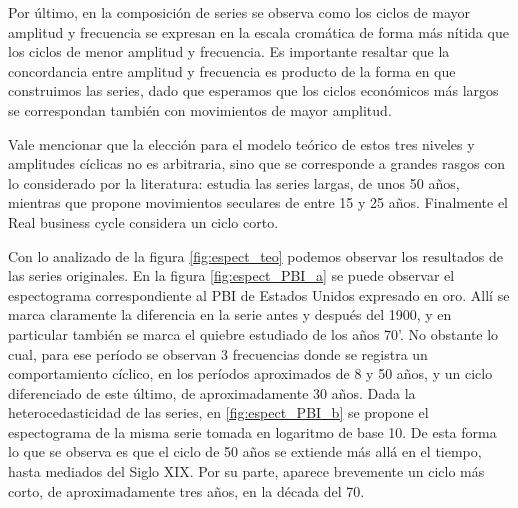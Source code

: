 \documentclass[a4paper]{article}
\begin{document}
Por último, en la composición de series se observa como los ciclos de mayor amplitud y frecuencia se expresan en la escala cromática de forma más nítida que los ciclos de menor amplitud y frecuencia. Es importante resaltar que la concordancia entre amplitud y frecuencia es producto de la forma en que construimos las series, dado que esperamos que los ciclos económicos más largos se correspondan también con movimientos de mayor amplitud.

Vale mencionar que la elección para el modelo teórico de estos tres niveles y amplitudes cíclicas no es arbitraria, sino que se corresponde a grandes rasgos con lo considerado por la literatura: \cite{kondratieff1979long} estudia las series largas, de unos 50 años, mientras que \cite{kuznets1930secular} propone movimientos seculares de entre 15 y 25 años. Finalmente el Real business cycle \citep{kydland1982time} considera un ciclo corto.



Con lo analizado de la figura \ref{fig:espect_teo} podemos observar los resultados de las series originales. En la figura \ref{fig:espect_PBI_a} se puede observar el espectograma correspondiente al PBI de Estados Unidos expresado en oro. Allí se marca claramente la diferencia en la serie antes y después del 1900, y en particular también se marca el quiebre estudiado de los años 70'. No obstante lo cual, para ese período se observan 3 frecuencias donde se registra un comportamiento cíclico, en los períodos aproximados de 8 y 50 años, y un ciclo diferenciado de este último, de aproximadamente 30 años. Dada la heterocedasticidad de las series, en \ref{fig:espect_PBI_b} se propone el espectograma de la misma serie tomada en logaritmo de base 10. De esta forma lo que se observa es que el ciclo de 50 años se extiende más allá en el tiempo, hasta mediados del Siglo XIX. Por su parte, aparece brevemente un ciclo más corto, de aproximadamente tres años, en la década del 70.
\end{document}

